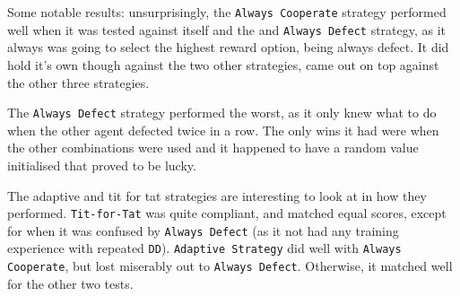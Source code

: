 \documentclass[11pt]{scrartcl} %
\begin{document}
Some notable results: unsurprisingly, the \texttt{Always Cooperate} strategy performed well when it was tested against itself and the and \texttt{Always Defect} strategy, as it always was going to select the highest reward option, being always defect.
It did hold it's own though against the two other strategies, came out on top against the other three strategies.

The \texttt{Always Defect} strategy performed the worst, as it only knew what to do when the other agent defected twice in a row. 
The only wins it had were when the other combinations were used and it happened to have a random value initialised that proved to be lucky.


The adaptive and tit for tat strategies are interesting to look at in how they performed.
\texttt{Tit-for-Tat} was quite compliant, and matched equal scores, except for when it was confused by \texttt{Always Defect} (as it not had any training experience with repeated \texttt{DD}).
\texttt{Adaptive Strategy} did well with \texttt{Always Cooperate}, but lost miserably out to \texttt{Always Defect}. Otherwise, it matched well for the other two tests.

\end{document}
